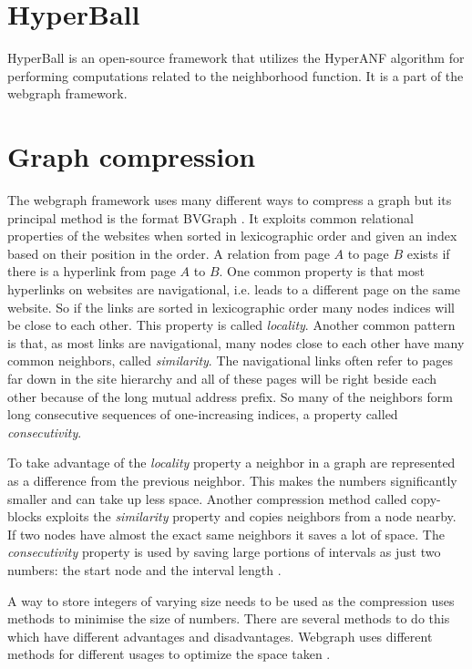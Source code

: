 \section{HyperBall}
HyperBall is an open-source framework that utilizes the HyperANF algorithm for performing computations related to the neighborhood function. It is a part of the webgraph framework.

\section{Graph compression}
\label{sec:Compression}

The webgraph framework \cite{webgraph} uses many different ways to compress a graph but its principal method is the format BVGraph \cite{webgraph-compression}. It exploits common relational properties of the websites when sorted in lexicographic order and given an index based on their position in the order. A relation from page $A$ to page $B$ exists if there is a hyperlink from page $A$ to $B$. One common property is that most hyperlinks on websites are navigational, i.e. leads to a different page on the same website. So if the links are sorted in lexicographic order many nodes indices will be close to each other. This property is called \emph{locality}. Another common pattern is that, as most links are navigational, many nodes close to each other have many common neighbors, called \emph{similarity}. The navigational links often refer to pages far down in the site hierarchy and all of these pages will be right beside each other because of the long mutual address prefix. So many of the neighbors form long consecutive sequences of one-increasing indices, a property called \emph{consecutivity}.

To take advantage of the \emph{locality} property a neighbor in a graph are represented as a difference from the previous neighbor. This makes the numbers significantly smaller and can take up less space. Another compression method called copy-blocks exploits the \emph{similarity} property and copies neighbors from a node nearby. If two nodes have almost the exact same neighbors it saves a lot of space. The \emph{consecutivity} property is used by saving large portions of intervals as just two numbers: the start node and the interval length \cite{webgraph-compression}. 

A way to store integers of varying size needs to be used as the compression uses methods to minimise the size of numbers. There are several methods to do this which have different advantages and disadvantages. Webgraph uses different methods for different usages to optimize the space taken \cite{webgraph-compression}. 

